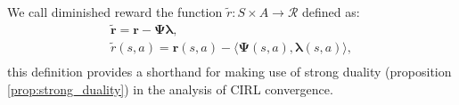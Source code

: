 \begin{definition}
    \label{def:diminished_reward}
    We call diminished reward the function $\tilde{r}:S \times A\rightarrow \mathcal{R}$ defined as:
    \begin{align*}
        \tilde{\bm{r}} = \bm{r} - \bm{\Psi} \bm{\lambda}, \\
        \tilde{{r}}(s,a) = \bm{r}(s,a) - \langle \bm{\Psi}(s,a),\bm{\lambda}(s,a)\rangle, \\
    \end{align*}
    this definition provides a shorthand for making use of strong duality (proposition \ref{prop:strong_duality}) in the analysis of CIRL convergence.
\end{definition}